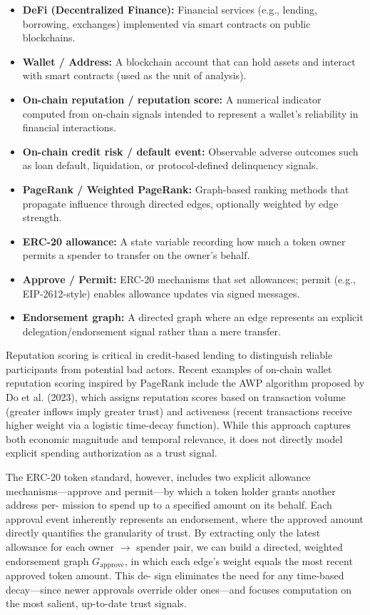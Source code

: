 \documentclass[12pt]{article}
\begin{document}
\begin{itemize}
\item[\textbullet] \textbf{DeFi (Decentralized Finance): }Financial services (e.g., lending, borrowing, exchanges) implemented via smart contracts on public blockchains.
\item[\textbullet] \textbf{Wallet / Address: }A blockchain account that can hold assets and interact with smart contracts (used as the unit of analysis).
\item[\textbullet] \textbf{On-chain reputation / reputation score: }A numerical indicator computed from on-chain signals intended to represent a wallet's reliability in financial interactions.
\item[\textbullet] \textbf{On-chain credit risk / default event: }Observable adverse outcomes such as loan default, liquidation, or protocol-defined delinquency signals.
\item[\textbullet] \textbf{PageRank / Weighted PageRank: }Graph-based ranking methods that propagate influence through directed edges, optionally weighted by edge strength.
\item[\textbullet] \textbf{ERC-20 allowance: }A state variable recording how much a token owner permits a spender to transfer on the owner's behalf.
\item[\textbullet] \textbf{Approve / Permit: }ERC-20 mechanisms that set allowances; permit (e.g., EIP-2612-style) enables allowance updates via signed messages.
\item[\textbullet] \textbf{Endorsement graph: }A directed graph where an edge represents an explicit delegation/endorsement signal rather than a mere transfer.
\end{itemize}
Reputation scoring is critical in credit-based lending to distinguish reliable participants from potential bad actors. Recent examples of on-chain wallet reputation scoring inspired by PageRank include the AWP algorithm proposed by Do et al. (2023), which assigns reputation scores based on transaction volume (greater inflows imply greater trust) and activeness (recent transactions receive higher weight via a logistic time-decay function). While this approach captures both economic magnitude and temporal relevance, it does not directly model explicit spending authorization as a trust signal.


The ERC-20 token standard, however, includes two explicit allowance mechanisms---approve and permit---by which a token holder grants another address per- mission to spend up to a specified amount on its behalf. Each approval event inherently represents an endorsement, where the approved amount directly quantifies the granularity of trust. By extracting only the latest allowance for each owner \(\to\) spender pair, we can build a directed, weighted endorsement graph $G_{\text{approve}}$, in which each edge's weight equals the most recent approved token amount. This de- sign eliminates the need for any time-based decay---since newer approvals override older ones---and focuses computation on the most salient, up-to-date trust signals.
\end{document}
